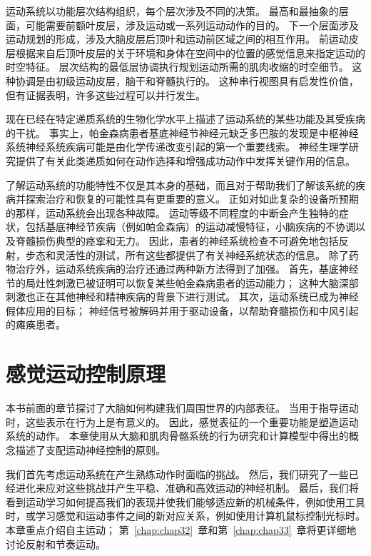 运动系统以功能层次结构组织，每个层次涉及不同的决策。
最高和最抽象的层面，可能需要前额叶皮层，涉及运动或一系列运动动作的目的。
下一个层面涉及运动规划的形成，涉及大脑皮层后顶叶和运动前区域之间的相互作用。
前运动皮层根据来自后顶叶皮层的关于环境和身体在空间中的位置的感觉信息来指定运动的时空特征。
层次结构的最低层协调执行规划运动所需的肌肉收缩的时空细节。
这种协调是由初级运动皮层，脑干和脊髓执行的。
这种串行视图具有启发性价值，但有证据表明，许多这些过程可以并行发生。


现在已经在特定递质系统的生物化学水平上描述了运动系统的某些功能及其受疾病的干扰。
事实上，帕金森病患者基底神经节神经元缺乏多巴胺的发现是中枢神经系统神经系统疾病可能是由化学传递改变引起的第一个重要线索。
神经生理学研究提供了有关此类递质如何在动作选择和增强成功动作中发挥关键作用的信息。


了解运动系统的功能特性不仅是其本身的基础，而且对于帮助我们了解该系统的疾病并探索治疗和恢复的可能性具有更重要的意义。
正如对如此复杂的设备所预期的那样，运动系统会出现各种故障。
运动等级不同程度的中断会产生独特的症状，包括基底神经节疾病（例如帕金森病）的运动减慢特征，小脑疾病的不协调以及脊髓损伤典型的痉挛和无力。
因此，患者的神经系统检查不可避免地包括反射，步态和灵活性的测试，所有这些都提供了有关神经系统状态的信息。
除了药物治疗外，运动系统疾病的治疗还通过两种新方法得到了加强。
首先，基底神经节的局灶性刺激已被证明可以恢复某些帕金森病患者的运动能力；
这种大脑深部刺激也正在其他神经和精神疾病的背景下进行测试。
其次，运动系统已成为神经假体应用的目标；
神经信号被解码并用于驱动设备，以帮助脊髓损伤和中风引起的瘫痪患者。




\chapter{感觉运动控制原理} \label{chap:chap30}

本书前面的章节探讨了大脑如何构建我们周围世界的内部表征。
当用于指导运动时，这些表示在行为上是有意义的。
因此，感觉表征的一个重要功能是塑造运动系统的动作。 
本章使用从大脑和肌肉骨骼系统的行为研究和计算模型中得出的概念描述了支配运动神经控制的原则。


我们首先考虑运动系统在产生熟练动作时面临的挑战。
然后，我们研究了一些已经进化来应对这些挑战并产生平稳、准确和高效运动的神经机制。
最后，我们将看到运动学习如何提高我们的表现并使我们能够适应新的机械条件，例如使用工具时，或学习感觉和运动事件之间的新对应关系，例如使用计算机鼠标控制光标时。
本章重点介绍自主运动；
第~\ref{chap:chap32}~章和第~\ref{chap:chap33}~章将更详细地讨论反射和节奏运动。


